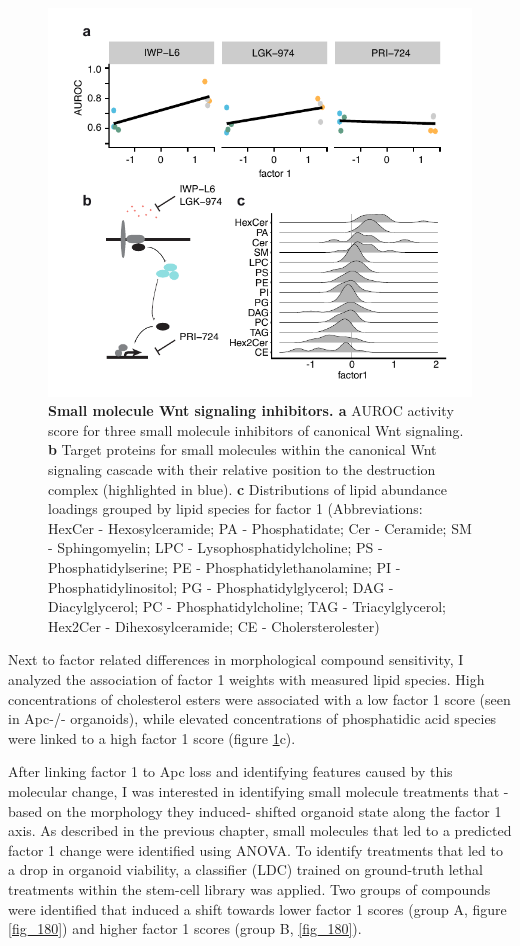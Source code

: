 \begin{flushleft}
\begin{figure}[h!]
\centering
\includegraphics[scale=0.75,keepaspectratio]{figures/adenomaprofiling/pdf/fig_2_2.pdf}
\caption{\textbf{Small molecule Wnt signaling inhibitors. a} AUROC activity score for three small molecule inhibitors of canonical Wnt signaling. \textbf{b} Target proteins for small molecules within the canonical Wnt signaling cascade with their relative position to the destruction complex (highlighted in blue). \textbf{c} Distributions of lipid abundance loadings grouped by lipid species for factor 1 (Abbreviations: HexCer - Hexosylceramide; PA - Phosphatidate; Cer - Ceramide; SM - Sphingomyelin; LPC - Lysophosphatidylcholine; PS - Phosphatidylserine; PE - Phosphatidylethanolamine; PI - Phosphatidylinositol; PG - Phosphatidylglycerol; DAG - Diacylglycerol; PC - Phosphatidylcholine; TAG - Triacylglycerol; Hex2Cer - Dihexosylceramide; CE - Cholersterolester)}
\label{fig_199}
\end{figure}
\bigbreak

Next to factor related differences in morphological compound sensitivity, I analyzed the association of factor 1 weights with measured lipid species. High concentrations of cholesterol esters were associated with a low factor 1 score (seen in Apc-/- organoids), while elevated concentrations of phosphatidic acid species were linked to a high factor 1 score (figure \ref{fig_199}c).

\smallbreak
After linking factor 1 to Apc loss and identifying features caused by this molecular change, I was interested in identifying small molecule treatments that -based on the morphology they induced- shifted organoid state along the factor 1 axis. As described in the previous chapter, small molecules that led to a predicted factor 1 change were identified using ANOVA. To identify treatments that led to a drop in organoid viability, a classifier (LDC) trained on ground-truth lethal treatments within the stem-cell library was applied. Two groups of compounds were identified that induced a shift towards lower factor 1 scores (group A, figure \ref{fig_180}) and higher factor 1 scores (group B, \ref{fig_180}). 


\end{flushleft}
